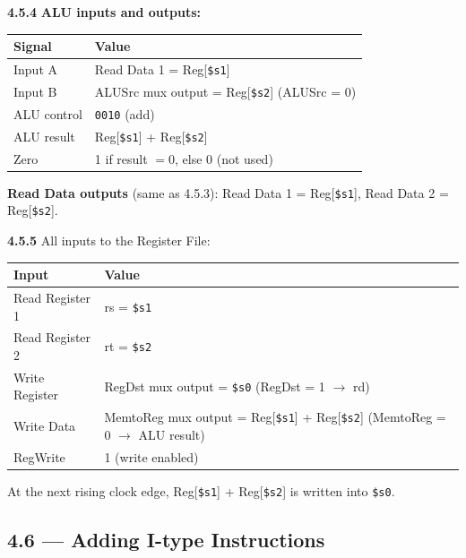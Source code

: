 \medskip\noindent\textbf{4.5.4}
\textbf{ALU inputs and outputs:}

\begin{center}
\begin{tabular}{ll}
\toprule
\textbf{Signal} & \textbf{Value} \\
\midrule
Input A     & Read Data 1 = Reg[\texttt{\$s1}] \\
Input B     & ALUSrc mux output = Reg[\texttt{\$s2}] \quad (ALUSrc = 0) \\
ALU control & \texttt{0010} (add) \\
ALU result  & Reg[\texttt{\$s1}] + Reg[\texttt{\$s2}] \\
Zero        & 1 if result $= 0$, else 0 \quad (not used) \\
\bottomrule
\end{tabular}
\end{center}

\noindent\textbf{Read Data outputs} (same as 4.5.3):
Read Data 1 = Reg[\texttt{\$s1}], Read Data 2 = Reg[\texttt{\$s2}].

\medskip\noindent\textbf{4.5.5}
All inputs to the Register File:

\begin{center}
\begin{tabular}{ll}
\toprule
\textbf{Input} & \textbf{Value} \\
\midrule
Read Register 1  & rs = \texttt{\$s1} \\
Read Register 2  & rt = \texttt{\$s2} \\
Write Register   & RegDst mux output = \texttt{\$s0}
                   \quad (RegDst = 1 $\to$ rd) \\
Write Data       & MemtoReg mux output = Reg[\texttt{\$s1}] + Reg[\texttt{\$s2}]
                   \quad (MemtoReg = 0 $\to$ ALU result) \\
RegWrite         & 1 (write enabled) \\
\bottomrule
\end{tabular}
\end{center}

\noindent At the next rising clock edge,
Reg[\texttt{\$s1}] + Reg[\texttt{\$s2}] is written into \texttt{\$s0}.
\subsection*{4.6 --- Adding I-type Instructions}
\hypertarget{sol-4.6}{}

